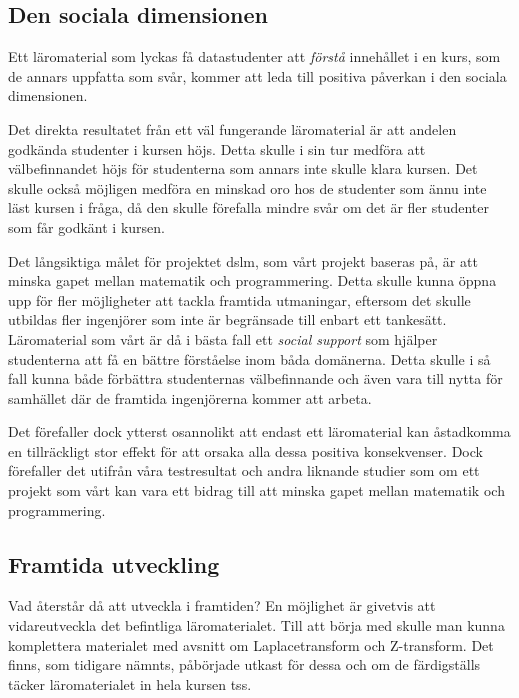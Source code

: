 \documentclass[12pt,a4paper,twoside,openright]{article}
\begin{document}

\subsection{Den sociala dimensionen}

Ett läromaterial som lyckas få datastudenter att \emph{förstå}
innehållet i en kurs, som de annars uppfatta som svår, kommer att leda
till positiva påverkan i den sociala
dimensionen. %

Det direkta resultatet från ett väl fungerande läromaterial är att
andelen godkända studenter i kursen höjs. Detta skulle i sin tur
medföra att välbefinnandet höjs för studenterna som annars inte skulle
klara kursen. Det skulle också möjligen medföra en minskad oro hos de
studenter som ännu inte läst kursen i fråga, då den skulle förefalla
mindre svår om det är fler studenter som får godkänt i kursen.

Det långsiktiga målet för projektet \gls{dslm}, som vårt projekt
baseras på, är att minska gapet mellan matematik och
programmering. %
Detta skulle kunna öppna upp för fler möjligheter att tackla framtida
utmaningar, eftersom det skulle utbildas fler ingenjörer som inte är
begränsade till enbart ett tankesätt.
Läromaterial som vårt  är då i bästa fall ett \emph{social support}
som hjälper studenterna att få en bättre förståelse inom båda
domänerna. Detta skulle i så fall kunna både förbättra studenternas
välbefinnande och även vara till nytta för samhället där de framtida
ingenjörerna kommer att arbeta.

Det förefaller dock ytterst osannolikt att endast ett läromaterial kan
åstadkomma en tillräckligt stor effekt för att orsaka alla dessa
positiva konsekvenser. Dock förefaller det utifrån våra testresultat
och andra liknande studier som om ett projekt som vårt kan vara ett
bidrag till att minska gapet mellan matematik och programmering.

\subsection{Framtida utveckling}
Vad återstår då att utveckla i framtiden? En möjlighet är givetvis att
vidareutveckla det befintliga läromaterialet. Till att börja med
skulle man kunna komplettera materialet med avsnitt om
Laplacetransform och Z-transform. Det finns, som tidigare nämnts,
påbörjade utkast för dessa och om de färdigställs täcker
läromaterialet in hela kursen \gls{tss}.
\end{document}
